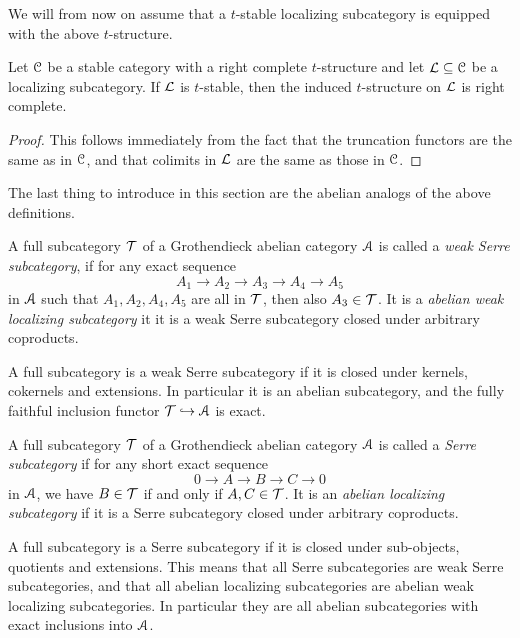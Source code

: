 We will from now on assume that a $t$-stable localizing subcategory is equipped with the above $t$-structure. 

\begin{proposition}
    \label{ch3:prop:induced-t-structure-on-stable-localizing}
    Let $\EuScript{C}$ be a stable category with a right complete $t$-structure and let $\mathcal{L}\subseteq \EuScript{C}$ be a localizing subcategory. If $\mathcal{L}$ is $t$-stable, then the induced $t$-structure on $\mathcal{L}$ is right complete.  
\end{proposition}
\begin{proof}
    This follows immediately from the fact that the truncation functors are the same as in $\EuScript{C}$, and that colimits in $\mathcal{L}$ are the same as those in $\EuScript{C}$. 
\end{proof}

The last thing to introduce in this section are the abelian analogs of the above definitions. 

\begin{definition}
    A full subcategory $\mathcal{T}$ of a Grothendieck abelian category $\EuScript{A}$ is called a \emph{weak Serre subcategory}, if for any exact sequence 
    \[A_1 \to A_2 \to A_3 \to A_4 \to A_5\]
    in $\EuScript{A}$ such that $A_1, A_2, A_4, A_5$ are all in $\mathcal{T}$, then also $A_3 \in \mathcal{T}$. It is a \emph{abelian weak localizing subcategory} it it is a weak Serre subcategory closed under arbitrary coproducts. 
\end{definition}

\begin{remark}
    A full subcategory is a weak Serre subcategory if it is closed under kernels, cokernels and extensions. In particular it is an abelian subcategory, and the fully faithful inclusion functor $\mathcal{T}\hookrightarrow \EuScript{A}$ is exact. 
\end{remark}

\begin{definition}
    A full subcategory $\mathcal{T}$ of a Grothendieck abelian category $\EuScript{A}$ is called a \emph{Serre subcategory} if for any short exact sequence 
    \[0\to A\to B\to C\to 0\]
    in $\EuScript{A}$, we have $B\in \mathcal{T}$ if and only if $A, C \in \mathcal{T}$. It is an \emph{abelian localizing subcategory} if it is a Serre subcategory closed under arbitrary coproducts. 
\end{definition}

\begin{remark}
    A full subcategory is a Serre subcategory if it is closed under sub-objects, quotients and extensions. This means that all Serre subcategories are weak Serre subcategories, and that all abelian localizing subcategories are abelian weak localizing subcategories. In particular they are all abelian subcategories with exact inclusions into $\EuScript{A}$. 
\end{remark}

